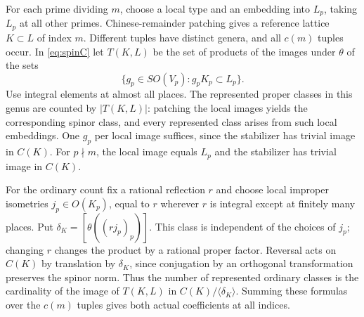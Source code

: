 For each prime dividing $m$, choose a local type and an embedding
into $L_p$, taking $L_p$ at all other primes. Chinese-remainder
patching gives a reference lattice $K\subset L$ of index $m$.
Different tuples have distinct genera, and all $c(m)$ tuples occur. In \eqref{eq:spinC} let $T(K,L)$ be the set of products of the images under $\theta$ of the sets
\[
 \{g_p\in SO(V_p):g_p K_p\subset L_p\}.
\]
Use integral elements at almost all places. The represented proper classes in this genus are counted by $|T(K,L)|$: patching the local images yields the corresponding spinor class, and every represented class arises from such local embeddings. 
One $g_p$ per local image suffices, since the stabilizer has
trivial image in $C(K)$. For $p\nmid m$, the local image equals $L_p$ and the stabilizer
has trivial image in $C(K)$.

For the ordinary count fix a rational reflection $r$ and choose local improper isometries $j_p\in O(K_p)$, equal to $r$ wherever $r$ is integral except at finitely many places. Put $\delta_K=[\theta((rj_p)_p)]$. This class is independent of the choices of $j_p$; changing $r$ changes the product by a rational proper factor. Reversal acts on $C(K)$ by translation by $\delta_K$, since conjugation by an orthogonal transformation preserves the spinor norm. Thus the number of represented ordinary classes is the cardinality of the image of $T(K,L)$ in $C(K)/\langle\delta_K\rangle$. Summing these formulas over the $c(m)$ tuples gives both actual coefficients at all indices.

